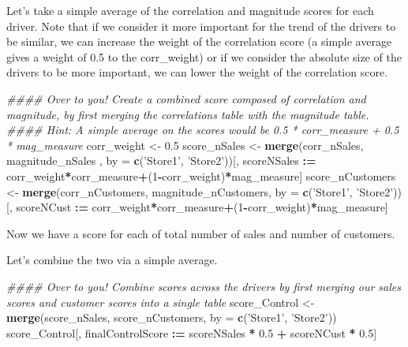 \documentclass[]{article}
\newenvironment{Shaded}{\begin{snugshade}}{\end{snugshade}}
\newcommand{\CommentTok}[1]{\textcolor[rgb]{0.56,0.35,0.01}{\textit{#1}}}
\newcommand{\DataTypeTok}[1]{\textcolor[rgb]{0.13,0.29,0.53}{#1}}
\newcommand{\DecValTok}[1]{\textcolor[rgb]{0.00,0.00,0.81}{#1}}
\newcommand{\ErrorTok}[1]{\textcolor[rgb]{0.64,0.00,0.00}{\textbf{#1}}}
\newcommand{\FloatTok}[1]{\textcolor[rgb]{0.00,0.00,0.81}{#1}}
\newcommand{\KeywordTok}[1]{\textcolor[rgb]{0.13,0.29,0.53}{\textbf{#1}}}
\newcommand{\NormalTok}[1]{#1}
\newcommand{\OperatorTok}[1]{\textcolor[rgb]{0.81,0.36,0.00}{\textbf{#1}}}
\newcommand{\StringTok}[1]{\textcolor[rgb]{0.31,0.60,0.02}{#1}}
\begin{document}
Let's take a simple average of the correlation and magnitude scores for
each driver. Note that if we consider it more important for the trend of
the drivers to be similar, we can increase the weight of the correlation
score (a simple average gives a weight of 0.5 to the corr\_weight) or if
we consider the absolute size of the drivers to be more important, we
can lower the weight of the correlation score.

\begin{Shaded}
\begin{Highlighting}[]
\CommentTok{#### Over to you! Create a combined score composed of correlation and magnitude, by first merging the correlations table with the magnitude table.}
\CommentTok{#### Hint: A simple average on the scores would be 0.5 * corr_measure + 0.5 * mag_measure}
\NormalTok{corr_weight <-}\StringTok{ }\FloatTok{0.5}
\NormalTok{score_nSales <-}\StringTok{ }\KeywordTok{merge}\NormalTok{(corr_nSales, magnitude_nSales , }\DataTypeTok{by =} \KeywordTok{c}\NormalTok{(}\StringTok{'Store1'}\NormalTok{, }\StringTok{'Store2'}\NormalTok{))[, scoreNSales }\OperatorTok{:}\ErrorTok{=}\StringTok{ }\NormalTok{corr_weight}\OperatorTok{*}\NormalTok{corr_measure}\OperatorTok{+}\NormalTok{(}\DecValTok{1}\OperatorTok{-}\NormalTok{corr_weight)}\OperatorTok{*}\NormalTok{mag_measure]}
\NormalTok{score_nCustomers <-}\StringTok{ }\KeywordTok{merge}\NormalTok{(corr_nCustomers, magnitude_nCustomers, }\DataTypeTok{by =} \KeywordTok{c}\NormalTok{(}\StringTok{'Store1'}\NormalTok{, }\StringTok{'Store2'}\NormalTok{))[, scoreNCust }\OperatorTok{:}\ErrorTok{=}\StringTok{ }\NormalTok{corr_weight}\OperatorTok{*}\NormalTok{corr_measure}\OperatorTok{+}\NormalTok{(}\DecValTok{1}\OperatorTok{-}\NormalTok{corr_weight)}\OperatorTok{*}\NormalTok{mag_measure]}
\end{Highlighting}
\end{Shaded}

Now we have a score for each of total number of sales and number of
customers.

Let's combine the two via a simple average.

\begin{Shaded}
\begin{Highlighting}[]
\CommentTok{#### Over to you! Combine scores across the drivers by first merging our sales scores and customer scores into a single table}
\NormalTok{score_Control <-}\StringTok{ }\KeywordTok{merge}\NormalTok{(score_nSales, score_nCustomers, }\DataTypeTok{by =} \KeywordTok{c}\NormalTok{(}\StringTok{'Store1'}\NormalTok{, }\StringTok{'Store2'}\NormalTok{))}
\NormalTok{score_Control[, finalControlScore }\OperatorTok{:}\ErrorTok{=}\StringTok{ }\NormalTok{scoreNSales }\OperatorTok{*}\StringTok{ }\FloatTok{0.5} \OperatorTok{+}\StringTok{ }\NormalTok{scoreNCust }\OperatorTok{*}\StringTok{ }\FloatTok{0.5}\NormalTok{]}
\end{Highlighting}
\end{Shaded}
\end{document}
